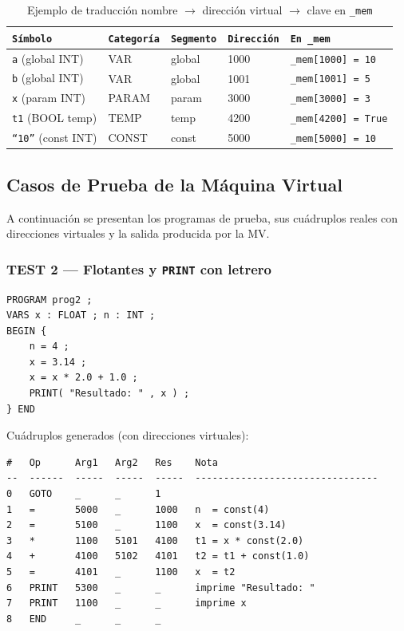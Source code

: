 \documentclass[12pt, letterpaper]{article}
\theoremstyle{definition}
\begin{document}
\begin{table}[H]
\centering
\caption{Ejemplo de traducción nombre $\rightarrow$ dirección virtual $\rightarrow$ clave en \texttt{\_mem}}
\label{tab:traduccion-dirs}
\begin{tabular}{|p{3.5cm}|p{1.8cm}|p{2cm}|p{2cm}|p{3.3cm}|}
    \hline
    \texttt{Símbolo} & \texttt{Categoría} & \texttt{Segmento} & \texttt{Dirección} & \texttt{En \_mem} \\ \hline
    \texttt{a} (global INT)   & VAR   & global & 1000 & \texttt{\_mem[1000] = 10}   \\ \hline
    \texttt{b} (global INT)   & VAR   & global & 1001 & \texttt{\_mem[1001] = 5}    \\ \hline
    \texttt{x} (param INT)    & PARAM & param  & 3000 & \texttt{\_mem[3000] = 3}    \\ \hline
    \texttt{t1} (BOOL temp)   & TEMP  & temp   & 4200 & \texttt{\_mem[4200] = True} \\ \hline
    \texttt{``10''} (const INT) & CONST & const  & 5000 & \texttt{\_mem[5000] = 10}   \\ \hline
\end{tabular}
\end{table}

\subsection{Casos de Prueba de la Máquina Virtual}

A continuación se presentan los programas de prueba, sus cuádruplos reales con direcciones virtuales y la salida producida por la MV.

\subsubsection*{TEST 2 --- Flotantes y \texttt{PRINT} con letrero}


\begin{verbatim}
PROGRAM prog2 ;
VARS x : FLOAT ; n : INT ;
BEGIN {
    n = 4 ;
    x = 3.14 ;
    x = x * 2.0 + 1.0 ;
    PRINT( "Resultado: " , x ) ;
} END
\end{verbatim}

Cuádruplos generados (con direcciones virtuales):
\begin{verbatim}
#   Op      Arg1   Arg2   Res    Nota
--  ------  -----  -----  -----  --------------------------------
0   GOTO    _      _      1
1   =       5000   _      1000   n  = const(4)
2   =       5100   _      1100   x  = const(3.14)
3   *       1100   5101   4100   t1 = x * const(2.0)
4   +       4100   5102   4101   t2 = t1 + const(1.0)
5   =       4101   _      1100   x  = t2
6   PRINT   5300   _      _      imprime "Resultado: "
7   PRINT   1100   _      _      imprime x
8   END     _      _      _
\end{verbatim}
\end{document}
